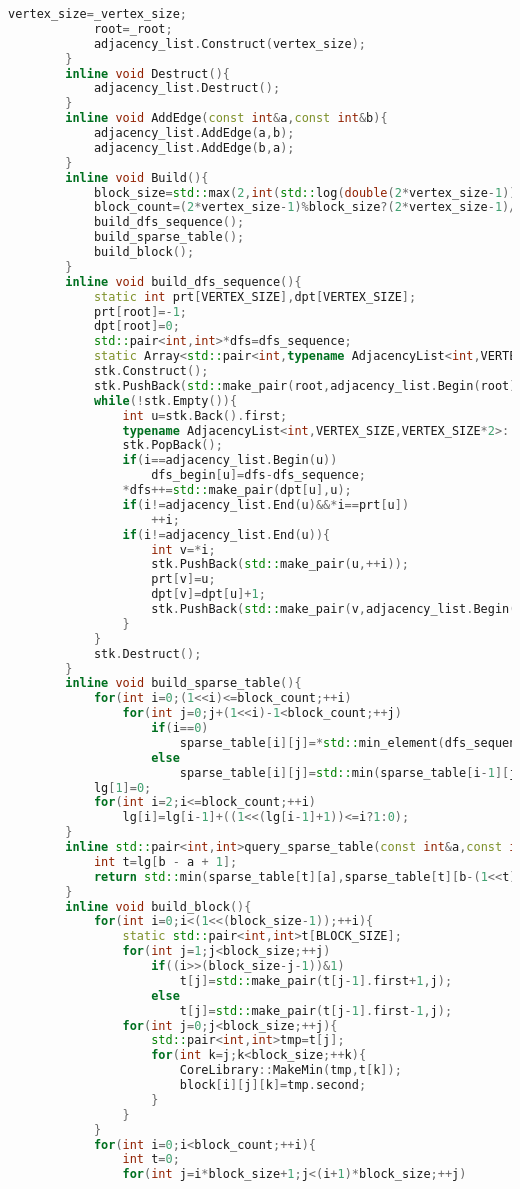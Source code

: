 \documentclass{book}
\begin{document}
\begin{lstlisting}[language=C++,title={Range Minimum Query.hpp (7403 bytes, 228 lines)}]
			vertex_size=_vertex_size;
			root=_root;
			adjacency_list.Construct(vertex_size);
		}
		inline void Destruct(){
			adjacency_list.Destruct();
		}
		inline void AddEdge(const int&a,const int&b){
			adjacency_list.AddEdge(a,b);
			adjacency_list.AddEdge(b,a);
		}
		inline void Build(){
			block_size=std::max(2,int(std::log(double(2*vertex_size-1))/(log(2.0)*2)));
			block_count=(2*vertex_size-1)%block_size?(2*vertex_size-1)/block_size+1:(2*vertex_size-1)/block_size;
			build_dfs_sequence();
			build_sparse_table();
			build_block();
		}
		inline void build_dfs_sequence(){
			static int prt[VERTEX_SIZE],dpt[VERTEX_SIZE];
			prt[root]=-1;
			dpt[root]=0;
			std::pair<int,int>*dfs=dfs_sequence;
			static Array<std::pair<int,typename AdjacencyList<int,VERTEX_SIZE,VERTEX_SIZE*2>::Iterator>,VERTEX_SIZE>stk;
			stk.Construct();
			stk.PushBack(std::make_pair(root,adjacency_list.Begin(root)));
			while(!stk.Empty()){
				int u=stk.Back().first;
				typename AdjacencyList<int,VERTEX_SIZE,VERTEX_SIZE*2>::Iterator i=stk.Back().second;
				stk.PopBack();
				if(i==adjacency_list.Begin(u))
					dfs_begin[u]=dfs-dfs_sequence;
				*dfs++=std::make_pair(dpt[u],u);
				if(i!=adjacency_list.End(u)&&*i==prt[u])
					++i;
				if(i!=adjacency_list.End(u)){
					int v=*i;
					stk.PushBack(std::make_pair(u,++i));
					prt[v]=u;
					dpt[v]=dpt[u]+1;
					stk.PushBack(std::make_pair(v,adjacency_list.Begin(v)));
				}
			}
			stk.Destruct();
		}
		inline void build_sparse_table(){
			for(int i=0;(1<<i)<=block_count;++i)
				for(int j=0;j+(1<<i)-1<block_count;++j)
					if(i==0)
						sparse_table[i][j]=*std::min_element(dfs_sequence+j*block_size,dfs_sequence+std::min((j+1)*block_size,2*vertex_size-1));
					else
						sparse_table[i][j]=std::min(sparse_table[i-1][j],sparse_table[i-1][j+(1<<(i-1))]);
			lg[1]=0;
			for(int i=2;i<=block_count;++i)
				lg[i]=lg[i-1]+((1<<(lg[i-1]+1))<=i?1:0);
		}
		inline std::pair<int,int>query_sparse_table(const int&a,const int&b){
			int t=lg[b - a + 1];
			return std::min(sparse_table[t][a],sparse_table[t][b-(1<<t)+1]);
		}
		inline void build_block(){
			for(int i=0;i<(1<<(block_size-1));++i){
				static std::pair<int,int>t[BLOCK_SIZE];
				for(int j=1;j<block_size;++j)
					if((i>>(block_size-j-1))&1)
						t[j]=std::make_pair(t[j-1].first+1,j);
					else
						t[j]=std::make_pair(t[j-1].first-1,j);
				for(int j=0;j<block_size;++j){
					std::pair<int,int>tmp=t[j];
					for(int k=j;k<block_size;++k){
						CoreLibrary::MakeMin(tmp,t[k]);
						block[i][j][k]=tmp.second;
					}
				}
			}
			for(int i=0;i<block_count;++i){
				int t=0;
				for(int j=i*block_size+1;j<(i+1)*block_size;++j)

\end{lstlisting}
\end{document}
